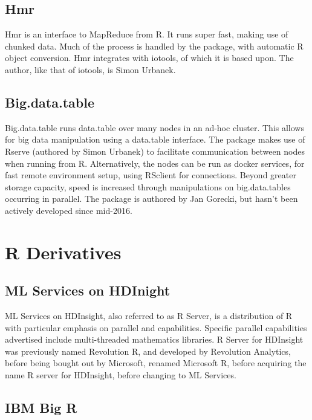 \documentclass[10pt,a4paper]{article}
\begin{document}
\subsection{Hmr}
\label{sec:hmr}

Hmr is an interface to MapReduce from R\cite{urbanek20}. It runs super
fast, making use of chunked data. Much of the process is handled by
the package, with automatic R object conversion. Hmr integrates with
iotools, of which it is based upon. The author, like that of iotools,
is Simon Urbanek.

\subsection{Big.data.table}
\label{sec:big.data.table}

Big.data.table runs data.table over many nodes in an ad-hoc
cluster\cite{gorecki16}. This allows for big data manipulation using a
data.table interface. The package makes use of Rserve (authored by
Simon Urbanek) to facilitate communication between nodes when running
from R. Alternatively, the nodes can be run as docker services, for
fast remote environment setup, using RSclient for connections. Beyond
greater storage capacity, speed is increased through manipulations on
big.data.tables occurring in parallel. The package is authored by Jan
Gorecki, but hasn't been actively developed since mid-2016.

\section{R Derivatives}
\label{sec:r-derivatives}

\subsection{ML Services on HDInight}
\label{sec:r-server-hdinsight}

ML Services on HDInsight, also referred to as R Server, is a
distribution of R with particular emphasis on parallel and
capabilities\cite{azure16:_r_server_hdins_r_analy}. Specific parallel
capabilities advertised include multi-threaded mathematics libraries.
R Server for HDInsight was previously named Revolution R, and
developed by Revolution Analytics, before being bought out by
Microsoft, renamed Microsoft R, before acquiring the name R server for
HDInsight, before changing to ML Services.

\subsection{IBM Big R}
\label{sec:ibm-big-r}
\end{document}
